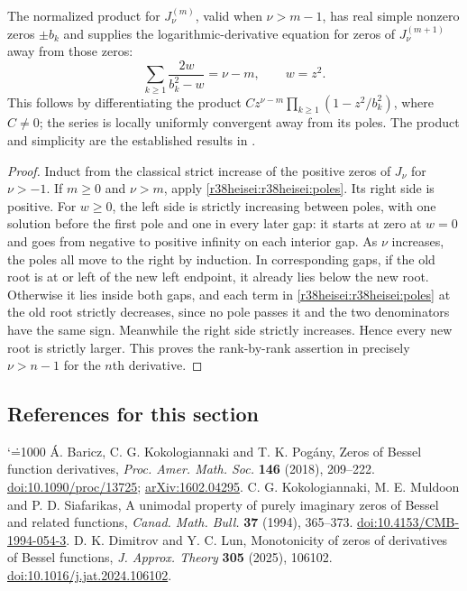 \documentclass[11pt,a4paper]{article}
\makeatletter
\numberwithin{equation}{section}
\theoremstyle{definition}
\theoremstyle{remark}
\renewenvironment{thebibliography}[1]
 {\subsection*{References for this section}\small
  \list{\@biblabel{\@arabic\c@enumiv}}
       {\settowidth\labelwidth{\@biblabel{#1}}\leftmargin\labelwidth
        \advance\leftmargin\labelsep\@openbib@code
        \usecounter{enumiv}\let\p@enumiv\@empty
        \renewcommand\theenumiv{\@arabic\c@enumiv}}
  \sloppy\clubpenalty4000\widowpenalty4000\sfcode`\.=1000\relax}
 {\def\@noitemerr{\@latex@warning{Empty bibliography}}\endlist}
\makeatother
\begin{document}
The normalized product for $J_\nu^{(m)}$, valid when $\nu>m-1$, has real simple nonzero zeros $\pm b_k$ and supplies the logarithmic-derivative equation for zeros of $J_\nu^{(m+1)}$ away from those zeros:
\begin{equation}\label{r38heisei:r38heisei:poles}
 \sum_{k\ge1}\frac{2w}{b_k^2-w}=\nu-m,\qquad w=z^2.
\end{equation}
This follows by differentiating the product
$Cz^{\nu-m}\prod_{k\ge1}(1-z^2/b_k^2)$, where $C\ne0$; the series is locally uniformly convergent away from its poles. The product and simplicity are the established results in \cite[Eq.~(2.1)]{r38heisei:bkp}.
\begin{proof}
Induct from the classical strict increase of the positive zeros of $J_\nu$ for $\nu>-1$. If $m\ge0$ and $\nu>m$, apply \eqref{r38heisei:r38heisei:poles}. Its right side is positive. For $w\ge0$, the left side is strictly increasing between poles, with one solution before the first pole and one in every later gap: it starts at zero at $w=0$ and goes from negative to positive infinity on each interior gap. As $\nu$ increases, the poles all move to the right by induction. In corresponding gaps, if the old root is at or left of the new left endpoint, it already lies below the new root. Otherwise it lies inside both gaps, and each term in \eqref{r38heisei:r38heisei:poles} at the old root strictly decreases, since no pole passes it and the two denominators have the same sign. Meanwhile the right side strictly increases. Hence every new root is strictly larger. This proves the rank-by-rank assertion in precisely $\nu>n-1$ for the $n$th derivative.

\end{proof}
\begin{thebibliography}{9}
 \'A. Baricz, C. G. Kokologiannaki and T. K. Pog\'any, Zeros of Bessel function derivatives, \emph{Proc. Amer. Math. Soc.} \textbf{146} (2018), 209--222. \href{https://doi.org/10.1090/proc/13725}{doi:10.1090/proc/13725}; \href{https://arxiv.org/abs/1602.04295}{arXiv:1602.04295}.
 C. G. Kokologiannaki, M. E. Muldoon and P. D. Siafarikas, A unimodal property of purely imaginary zeros of Bessel and related functions, \emph{Canad. Math. Bull.} \textbf{37} (1994), 365--373. \href{https://doi.org/10.4153/CMB-1994-054-3}{doi:10.4153/CMB-1994-054-3}.
 D. K. Dimitrov and Y. C. Lun, Monotonicity of zeros of derivatives of Bessel functions, \emph{J. Approx. Theory} \textbf{305} (2025), 106102. \href{https://doi.org/10.1016/j.jat.2024.106102}{doi:10.1016/j.jat.2024.106102}.
\end{thebibliography}
\end{document}
